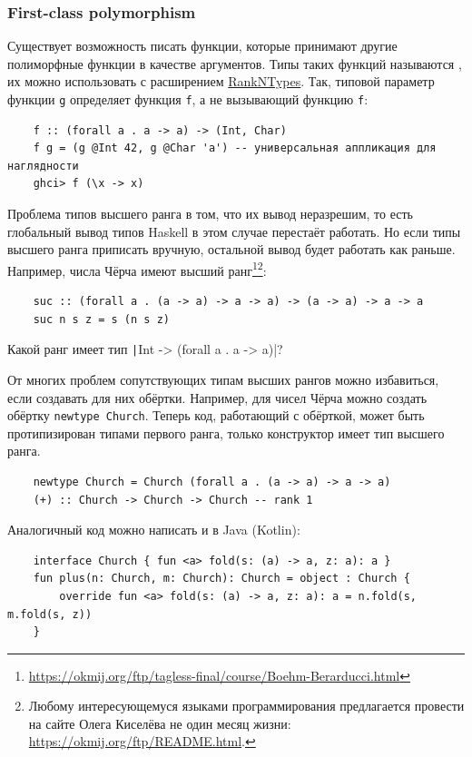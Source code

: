\subsubsection{First-class polymorphism} \label{subsubsec:first-class-polymorphism}

Существует возможность писать функции, которые принимают другие полиморфные функции в качестве аргументов.
Типы таких функций называются , их можно использовать с расширением \href{https://downloads.haskell.org/ghc/latest/docs/users_guide/exts/rank_polymorphism.html}{RankNTypes}.
Так, типовой параметр функции \texttt{g} определяет функция \texttt{f}, а не вызывающий функцию \texttt{f}:
\begin{verbatim}
    f :: (forall a . a -> a) -> (Int, Char)
    f g = (g @Int 42, g @Char 'a') -- универсальная аппликация для наглядности
    ghci> f (\x -> x)
\end{verbatim}

Проблема типов высшего ранга в том, что их вывод неразрешим, то есть глобальный вывод типов Haskell в этом случае перестаёт работать.
Но если типы высшего ранга приписать вручную, остальной вывод будет работать как раньше.
Например, числа Чёрча имеют высший ранг\footnote{\url{https://okmij.org/ftp/tagless-final/course/Boehm-Berarducci.html}}\footnote{Любому интересующемуся языками программирования предлагается провести на сайте Олега Киселёва не один месяц жизни: \url{https://okmij.org/ftp/README.html}.}:
\begin{verbatim}
    suc :: (forall a . (a -> a) -> a -> a) -> (a -> a) -> a -> a
    suc n s z = s (n s z)
\end{verbatim}

\begin{task}
    Какой ранг имеет тип \texttt|Int -> (forall a . a -> a)|?
\end{task}

От многих проблем сопутствующих типам высших рангов можно избавиться, если создавать для них обёртки.
Например, для чисел Чёрча можно создать обёртку \texttt{newtype Church}.
Теперь код, работающий с обёрткой, может быть протипизирован типами первого ранга, только конструктор имеет тип высшего ранга.
\begin{verbatim}
    newtype Church = Church (forall a . (a -> a) -> a -> a)
    (+) :: Church -> Church -> Church -- rank 1
\end{verbatim}
Аналогичный код можно написать и в Java (Kotlin):
\begin{verbatim}
    interface Church { fun <a> fold(s: (a) -> a, z: a): a }
    fun plus(n: Church, m: Church): Church = object : Church {
        override fun <a> fold(s: (a) -> a, z: a): a = n.fold(s, m.fold(s, z))
    }
\end{verbatim}

